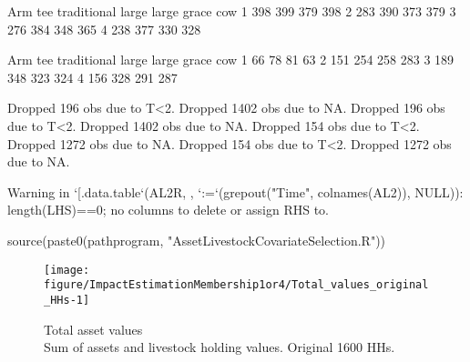 \begin{Schunk}
\begin{Soutput}
   Arm
tee traditional large large grace cow
  1         398   399         379 398
  2         283   390         373 379
  3         276   384         348 365
  4         238   377         330 328
\end{Soutput}
\begin{Soutput}
   Arm
tee traditional large large grace cow
  1          66    78          81  63
  2         151   254         258 283
  3         189   348         323 324
  4         156   328         291 287
\end{Soutput}
\begin{Soutput}
Dropped 196 obs due to T<2.
Dropped 1402 obs due to NA.
Dropped 196 obs due to T<2.
Dropped 1402 obs due to NA.
Dropped 154 obs due to T<2.
Dropped 1272 obs due to NA.
Dropped 154 obs due to T<2.
Dropped 1272 obs due to NA.
\end{Soutput}
\end{Schunk}

\begin{Schunk}
\begin{Soutput}
Warning in `[.data.table`(AL2R, , `:=`(grepout("Time", colnames(AL2)), NULL)): length(LHS)==0; no columns to delete or assign RHS to.
\end{Soutput}
\end{Schunk}



\begin{Schunk}
\begin{Sinput}
source(paste0(pathprogram, "AssetLivestockCovariateSelection.R"))
\end{Sinput}
\end{Schunk}

\begin{Schunk}
\begin{figure}

{\centering \texttt{[image: figure/ImpactEstimationMembership1or4/Total\_values\_original\_HHs-1]} 

}

\caption{Total asset values\\ {\footnotesize Sum of assets and livestock holding values. Original 1600 HHs.\setlength{\baselineskip}{8pt}}}\label{Figure Total values original HHs}
\end{figure}
\end{Schunk}



